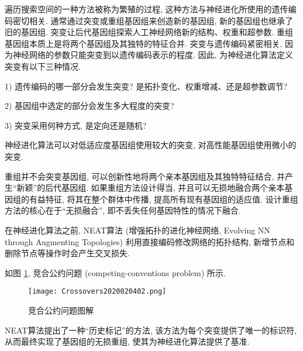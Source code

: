 \begin{remark}
    遍历搜索空间的一种方法被称为繁殖的过程, 这种方法与神经进化所使用的遗传编码密切相关.
    通常通过突变或重组基因组来创造新的基因组, 新的基因组也继承了旧的基因组.
    突变让后代基因组探索人工神经网络新的结构、权重和超参数. 重组基因组本质上是将两个基因组及其独特的特征合并.
突变与遗传编码紧密相关, 因为神经网络的参数只能突变到以遗传编码表示的程度. 因此, 为神经进化算法定义突变有以下三种情况.

1) 遗传编码的哪一部分会发生突变? 是拓扑变化、权重增减、还是超参数调节?

2) 基因组中选定的部分会发生多大程度的突变?

3) 突变采用何种方式, 是定向还是随机?

\begin{example}
    神经进化算法可以对低适应度基因组使用较大的突变, 对高性能基因组使用微小的突变.
\end{example}
重组并不会突变基因组, 可以创新性地将两个亲本基因组及其独特特征结合, 并产生“新颖”的后代基因组.
如果重组方法设计得当, 并且可以无损地融合两个亲本基因组的有益特征, 将其在整个群体中传播, 提高所有现有基因组的适应值.
设计重组方法的核心在于“无损融合”, 即不丢失任何基因特性的情况下融合.
\begin{example}
    在神经进化算法之前, NEAT算法 (增强拓扑的进化神经网络, Evolving NN through Augmenting Topologies) 利用直接编码修改网络的拓扑结构, 新增节点和删除节点等操作时会产生交叉损失.
\end{example}

如图 \ref{Crossovers2020020402}, 竞合公约问题 (competing-conventions problem) 所示.
\begin{figure}[H]
    \centering
    \texttt{[image: Crossovers2020020402.png]}
    \caption{竞合公约问题图解}
    \label{Crossovers2020020402}
\end{figure}
NEAT算法提出了一种“历史标记”的方法, 该方法为每个突变提供了唯一的标识符, 从而最终实现了基因组的无损重组, 使其为神经进化算法提供了基准.
\end{remark}

